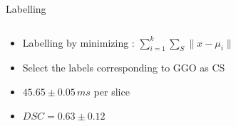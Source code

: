 \documentclass{standalone}
\begin{document}
\begin{frame}{Labelling}
\begin{columns}
\begin{column}{.4\textwidth}
\begin{block}{}
\begin{itemize}
						\item Labelling by minimizing : 
						$\sum_{i=1}^{k}\sum_{S} \| x - \mu_i\|$		
						
						\item Select the labels corresponding to GGO as CS
						
						\item $45.65\pm 0.05\,ms$ per slice
						
						\item $DSC = 0.63 \pm 0.12$
								
					\end{itemize}
				\end{block}
			\end{column}
		\end{columns}
	\end{frame}
\end{document}
